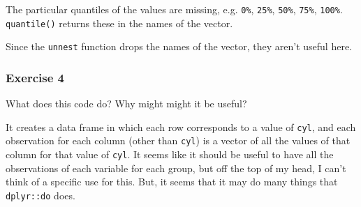 \documentclass[]{book}
\newenvironment{Shaded}{\begin{snugshade}}{\end{snugshade}}
\newcommand{\CommentTok}[1]{\textcolor[rgb]{0.56,0.35,0.01}{\textit{#1}}}
\newcommand{\KeywordTok}[1]{\textcolor[rgb]{0.13,0.29,0.53}{\textbf{#1}}}
\newcommand{\NormalTok}[1]{#1}
\newcommand{\OperatorTok}[1]{\textcolor[rgb]{0.81,0.36,0.00}{\textbf{#1}}}
\newcommand{\StringTok}[1]{\textcolor[rgb]{0.31,0.60,0.02}{#1}}
\theoremstyle{definition}
\theoremstyle{definition}
\theoremstyle{definition}
\theoremstyle{remark}
\begin{document}
The particular quantiles of the values are missing, e.g. \texttt{0\%},
\texttt{25\%}, \texttt{50\%}, \texttt{75\%}, \texttt{100\%}.
\texttt{quantile()} returns these in the names of the vector.

\begin{Shaded}
\end{Shaded}

Since the \texttt{unnest} function drops the names of the vector, they
aren't useful here.

\hypertarget{exercise-4-37}{%
\subsubsection{Exercise 4}\label{exercise-4-37}}

What does this code do? Why might might it be useful?

\begin{Shaded}
\end{Shaded}

It creates a data frame in which each row corresponds to a value of
\texttt{cyl}, and each observation for each column (other than
\texttt{cyl}) is a vector of all the values of that column for that
value of \texttt{cyl}. It seems like it should be useful to have all the
observations of each variable for each group, but off the top of my
head, I can't think of a specific use for this. But, it seems that it
may do many things that \texttt{dplyr::do} does.
\end{document}

